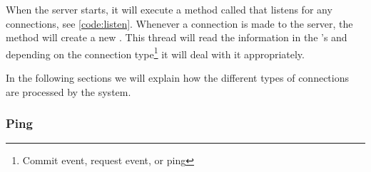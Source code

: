 When the server starts, it will execute a method called  that listens for any connections, see \autoref{code:listen}.
Whenever a connection is made to the server, the  method will create a new .
This thread will read the information in the 's  and depending on the connection type\footnote{Commit event, request event, or ping} it will deal with it appropriately.



In the following sections we will explain how the different types of connections are processed by the system.

\subsubsection*{Ping}


